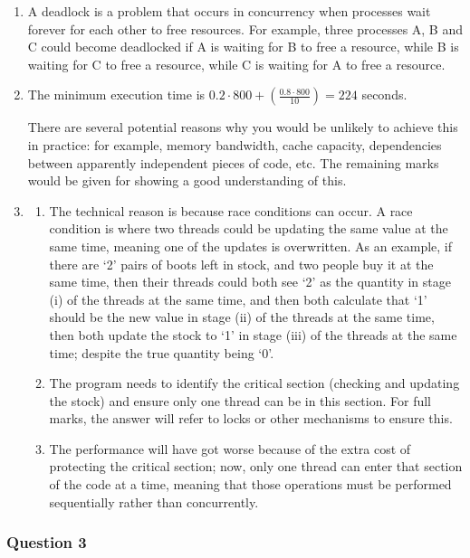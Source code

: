 {\color{blue}
\begin{enumerate}[label=(\alph*)]
    \item A deadlock is a problem that occurs in concurrency when processes wait forever for each other to free resources. For example, three processes A, B and C could become deadlocked if A is waiting for B to free a resource, while B is waiting for C to free a resource, while C is waiting for A to free a resource.

    \item The minimum execution time is $0.2 \cdot 800 + \left( \frac{0.8 \cdot 800}{10} \right) = 224$ seconds.

    There are several potential reasons why you would be unlikely to achieve this in practice: for example, memory bandwidth, cache capacity, dependencies between apparently independent pieces of code, etc. The remaining marks would be given for showing a good understanding of this.

    \item 
    \begin{enumerate}[label=(\roman*)]
        \item The technical reason is because race conditions can occur. A race condition is where two threads could be updating the same value at the same time, meaning one of the updates is overwritten. As an example, if there are ‘2’ pairs of boots left in stock, and two people buy it at the same time, then their threads could both see ‘2’ as the quantity in stage (i) of the threads at the same time, and then both calculate that ‘1’ should be the new value in stage (ii) of the threads at the same time, then both update the stock to ‘1’ in stage (iii) of the threads at the same time; despite the true quantity being ‘0’.

        \item The program needs to identify the critical section (checking and updating the stock) and ensure only one thread can be in this section. For full marks, the answer will refer to locks or other mechanisms to ensure this.

        \item The performance will have got worse because of the extra cost of protecting the critical section; now, only one thread can enter that section of the code at a time, meaning that those operations must be performed sequentially rather than concurrently.
    \end{enumerate}
\end{enumerate}
}
\subsubsection{Question 3}

